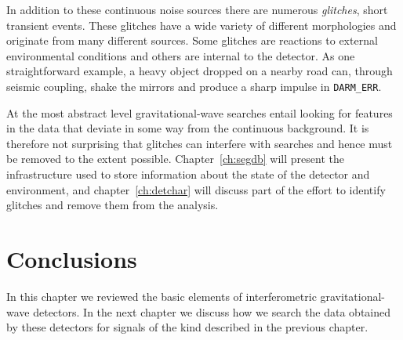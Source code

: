 In addition to these continuous noise sources there are numerous
\emph{glitches}, short transient events.  These glitches have a wide
variety of different morphologies and originate from many different
sources.  Some glitches are reactions to external environmental
conditions and others are internal to the detector.  As one
straightforward example, a heavy object dropped on a nearby road 
can, through seismic coupling, shake the mirrors and produce a sharp
impulse in \texttt{DARM\_ERR}.

At the most abstract level gravitational-wave searches entail looking
for features in the data that deviate in some way from the continuous
background.  It is therefore not surprising that glitches can
interfere with searches and hence must be removed to the extent
possible.  Chapter~\ref{ch:segdb} will present the infrastructure used
to store information about the state of the detector and environment,
and chapter~\ref{ch:detchar} will discuss part of the effort to
identify glitches and remove them from the analysis.

\section{Conclusions}

In this chapter we reviewed the basic elements of interferometric
gravitational-wave detectors.  In the next chapter we discuss how we
search the data obtained by these detectors for signals of the kind
described in the previous chapter.

